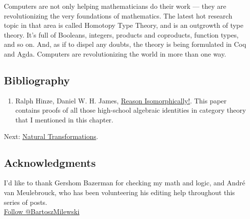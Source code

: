 Computers are not only helping mathematicians do their work --- they are
revolutionizing the very foundations of mathematics. The latest hot
research topic in that area is called Homotopy Type Theory, and is an
outgrowth of type theory. It's full of Booleans, integers, products and
coproducts, function types, and so on. And, as if to dispel any doubts,
the theory is being formulated in Coq and Agda. Computers are
revolutionizing the world in more than one way.

\subsection{Bibliography}\label{bibliography}

\begin{enumerate}
\tightlist
\item
  Ralph Hinze, Daniel W. H. James,
  \href{http://www.cs.ox.ac.uk/ralf.hinze/publications/WGP10.pdf}{Reason
  Isomorphically!}. This paper contains proofs of all those high-school
  algebraic identities in category theory that I mentioned in this
  chapter.
\end{enumerate}

Next:
\href{https://bartoszmilewski.com/2015/04/07/natural-transformations/}{Natural
Transformations}.

\subsection{Acknowledgments}\label{acknowledgments}

I'd like to thank Gershom Bazerman for checking my math and logic, and
André van Meulebrouck, who has been volunteering his editing help
throughout this series of posts.\\
\href{https://twitter.com/BartoszMilewski}{Follow @BartoszMilewski}
